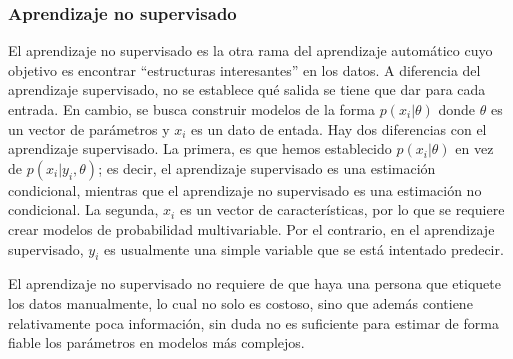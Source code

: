 	
	\subsubsection{Aprendizaje no supervisado}
	
		
		El aprendizaje no supervisado es la otra rama del aprendizaje automático cuyo objetivo es encontrar ``estructuras interesantes'' en los datos. A diferencia del aprendizaje supervisado, no se establece qué salida se tiene que dar para cada entrada. En cambio, se busca construir modelos de la forma $p(x_i | \theta)$ donde $\theta$ es un vector de parámetros y $x_i$ es un dato de entada. Hay dos diferencias con el aprendizaje supervisado. La primera, es que hemos establecido $p(x_i | \theta)$ en vez de $p(x_i | y_i, \theta)$; es decir, el aprendizaje supervisado es una estimación condicional, mientras que el aprendizaje no supervisado es una estimación no condicional. La segunda, $x_i$ es un vector de características, por lo que se requiere crear modelos de probabilidad multivariable. Por el contrario, en el aprendizaje supervisado, $y_i$ es usualmente una simple variable que se está intentado predecir.
		
		El aprendizaje no supervisado no requiere de que haya una persona que etiquete los datos manualmente, lo cual no solo es costoso, sino que además contiene relativamente poca información, sin duda no es suficiente para estimar de forma fiable los parámetros en modelos más complejos.